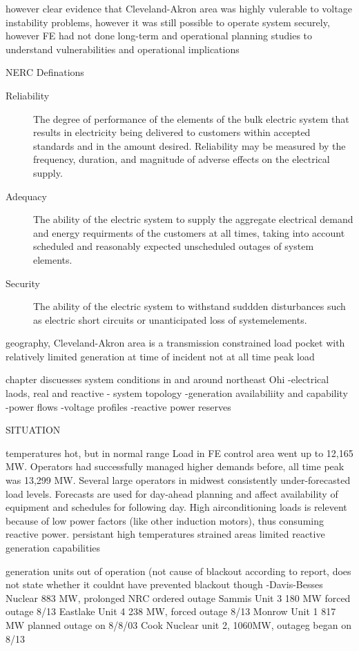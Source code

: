 however clear evidence that Cleveland-Akron area was highly vulerable to voltage instability problems, however it was still possible to operate system securely, however FE had not done long-term and operational planning studies to understand vulnerabilities and operational implications

NERC Definations
\begin{description}
\item[Reliability] The degree of performance of the elements of the bulk electric system that results in electricity being delivered to customers within accepted standards and in the amount desired.  Reliability may be measured by the frequency, duration, and magnitude of adverse effects on the electrical supply.
\item[Adequacy] The ability of the electric system to supply the aggregate electrical demand and energy requirments of the customers at all times, taking into account scheduled and reasonably expected unscheduled outages of system elements.
\item[Security]  The ability of the electric system to withstand suddden disturbances such as electric short circuits or unanticipated loss of systemelements.
\end{description}

geography, Cleveland-Akron area is a transmission constrained load pocket with relatively limited generation
at time of incident not at all time peak load

chapter discuesses system conditions in and around northeast Ohi
-electrical laods, real and reactive
- system topology
-generation availabiliity and capability
-power flows
-voltage profiles
-reactive power reserves


SITUATION

temperatures hot, but in normal range
Load in FE control area went up to 12,165 MW.  Operators had successfully managed higher demands before, all time peak was 13,299 MW.  Several large operators in midwest consistently under-forecasted load levels.  Forecasts are used for day-ahead planning and affect availability of equipment and schedules for following day.  High airconditioning loads is relevent because of low power factors (like other induction motors),  thus consuming reactive power.  persistant high temperatures strained areas limited reactive generation capabilities

generation units out of operation (not cause of blackout according to report, does not state whether it couldnt have prevented blackout though
-Davis-Besses Nuclear 883 MW, prolonged NRC ordered outage
Sammis Unit 3 180 MW forced outage 8/13
Eastlake Unit 4 238 MW, forced outage 8/13
Monrow Unit 1 817 MW planned outage on 8/8/03
Cook Nuclear unit 2, 1060MW, outageg began on 8/13

